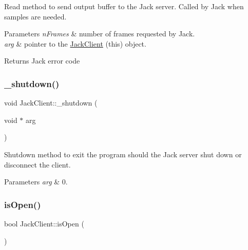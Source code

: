 Read method to send output buffer to the Jack server. Called by Jack when samples are needed. 
\begin{DoxyParams}{Parameters}
{\em n\+Frames} & number of frames requested by Jack. \\
\hline
{\em arg} & pointer to the \hyperlink{classdrumpi_1_1audio_1_1JackClient}{Jack\+Client} ({\ttfamily this}) object. \\
\hline
\end{DoxyParams}
\begin{DoxyReturn}{Returns}
Jack error code 
\end{DoxyReturn}
\mbox{\label{classdrumpi_1_1audio_1_1JackClient_ab3ec8c68b5c4473cdd3c53dc8f51b7c1}} 
\subsubsection{\texorpdfstring{\+\_\+shutdown()}{\_shutdown()}}
{\footnotesize\ttfamily void Jack\+Client\+::\+\_\+shutdown (\begin{DoxyParamCaption}\item[{void $\ast$}]{arg }\end{DoxyParamCaption})\hspace{0.3cm}{\ttfamily [static]}}

Shutdown method to exit the program should the Jack server shut down or disconnect the client. 
\begin{DoxyParams}{Parameters}
{\em arg} & 0. \\
\hline
\end{DoxyParams}
\mbox{\label{classdrumpi_1_1audio_1_1JackClient_a3b27776cda219ea706e77e96138b4c4e}} 
\subsubsection{\texorpdfstring{is\+Open()}{isOpen()}}
{\footnotesize\ttfamily bool Jack\+Client\+::is\+Open (\begin{DoxyParamCaption}{ }\end{DoxyParamCaption})}

